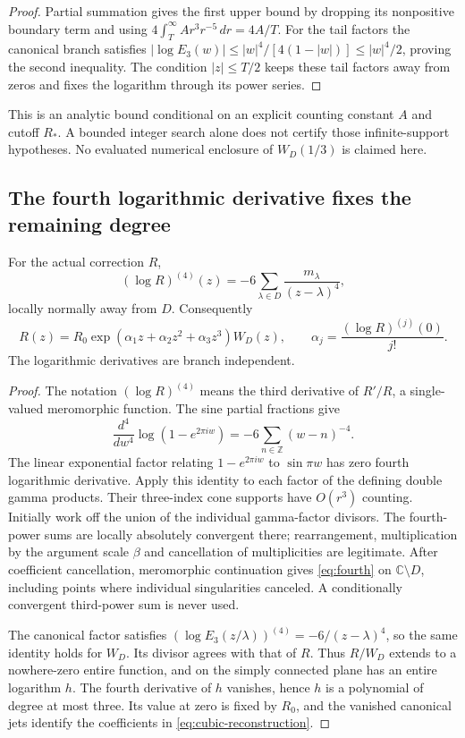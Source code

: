 \begin{proof}
Partial summation gives the first upper bound by dropping its nonpositive boundary term and using $4\int_T^\infty Ar^3r^{-5}\,dr=4A/T$. For the tail factors the canonical branch satisfies $|\log E_3(w)|\le |w|^4/[4(1-|w|)]\le |w|^4/2$, proving the second inequality. The condition $|z|\le T/2$ keeps these tail factors away from zeros and fixes the logarithm through its power series.
\end{proof}
This is an analytic bound conditional on an explicit counting constant $A$ and cutoff $R_*$. A bounded integer search alone does not certify those infinite-support hypotheses. No evaluated numerical enclosure of $W_D(1/3)$ is claimed here.

\subsection{The fourth logarithmic derivative fixes the remaining degree}
\begin{theorem}\label{thm:reconstruction}
For the actual correction $R$,
\begin{equation}\label{eq:fourth}
 (\log R)^{(4)}(z)=-6\sum_{\lambda\in D}\frac{m_\lambda}{(z-\lambda)^4},
\end{equation}
locally normally away from $D$. Consequently
\begin{equation}\label{eq:cubic-reconstruction}
 R(z)=R_0\exp(\alpha_1z+\alpha_2z^2+\alpha_3z^3)W_D(z),\qquad
 \alpha_j=\frac{(\log R)^{(j)}(0)}{j!}.
\end{equation}
The logarithmic derivatives are branch independent.
\end{theorem}
\begin{proof}
The notation $(\log R)^{(4)}$ means the third derivative of $R'/R$, a single-valued meromorphic function. The sine partial fractions \cite{DLMFSine} give
\[
 \frac{d^4}{dw^4}\log(1-e^{2\pi iw})
 =-6\sum_{n\in\mathbb Z}(w-n)^{-4}.
\]
The linear exponential factor relating $1-e^{2\pi iw}$ to $\sin\pi w$ has zero fourth logarithmic derivative. Apply this identity to each factor of the defining double gamma products. Their three-index cone supports have $O(r^3)$ counting. Initially work off the union of the individual gamma-factor divisors. The fourth-power sums are locally absolutely convergent there; rearrangement, multiplication by the argument scale $\beta$ and cancellation of multiplicities are legitimate. After coefficient cancellation, meromorphic continuation gives \eqref{eq:fourth} on $\mathbb C\setminus D$, including points where individual singularities canceled. A conditionally convergent third-power sum is never used.

The canonical factor satisfies $(\log E_3(z/\lambda))^{(4)}=-6/(z-\lambda)^4$, so the same identity holds for $W_D$. Its divisor agrees with that of $R$. Thus $R/W_D$ extends to a nowhere-zero entire function, and on the simply connected plane has an entire logarithm $h$. The fourth derivative of $h$ vanishes, hence $h$ is a polynomial of degree at most three. Its value at zero is fixed by $R_0$, and the vanished canonical jets identify the coefficients in \eqref{eq:cubic-reconstruction}.
\end{proof}
